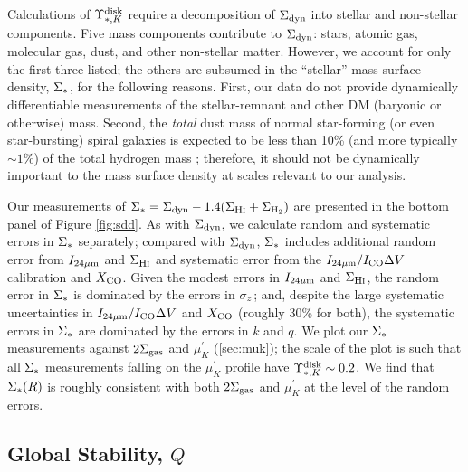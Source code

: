 \documentclass[apj,iop,numberedappendix]{emulateapj}
\begin{document}
Calculations of $\Upsilon_{\ast,K}^{\rm disk}$ require a decomposition of $\Sigma_{\rm dyn}$ into stellar
and non-stellar components.  Five mass components contribute to $\Sigma_{\rm dyn}$:
stars, atomic gas, molecular gas, dust, and other non-stellar matter.  However,
we account for only the first three listed; the others are subsumed in the
``stellar'' mass surface density, $\Sigma_{\rm \ast}$, for the following reasons.  First, our
data do not provide dynamically differentiable measurements of the
stellar-remnant and other DM (baryonic or otherwise) mass.  Second, the {\it
total} dust mass of normal star-forming (or even star-bursting) spiral galaxies
is expected to be less than 10\% (and more typically $\sim1$\%) of the total
hydrogen mass \citep{2007ApJ...663..866D}; therefore, it should not be
dynamically important to the mass surface density at scales relevant to our
analysis.  

Our measurements of $\Sigma_{\rm \ast} = \Sigma_{\rm dyn} - 1.4(\Sigma_{\mbox{\rm \footnotesize H{\scshape i}}} + \Sigma_{\rm H_2})$ are presented in the
bottom panel of Figure \ref{fig:sdd}.  As with $\Sigma_{\rm dyn}$, we calculate random
and systematic errors in $\Sigma_{\rm \ast}$ separately; compared with $\Sigma_{\rm dyn}$, $\Sigma_{\rm \ast}$
includes additional random error from $I_{24\mu{\rm m}}$ and $\Sigma_{\mbox{\rm \footnotesize H{\scshape i}}}$ and systematic error
from the $I_{24\mu{\rm m}}/I_{\rm CO}\Delta V$ calibration and $X_{\rm CO}$.  Given the modest errors in $I_{24\mu{\rm m}}$
and $\Sigma_{\mbox{\rm \footnotesize H{\scshape i}}}$, the random error in $\Sigma_{\rm \ast}$ is dominated by the errors in $\sigma_z$;
and, despite the large systematic uncertainties in $I_{24\mu{\rm m}}/I_{\rm CO}\Delta V$ and $X_{\rm CO}$
(roughly 30\% for both), the systematic errors in $\Sigma_{\rm \ast}$ are dominated by the
errors in $k$ and $q$.  We plot our $\Sigma_{\rm \ast}$ measurements against $2\Sigma_{\rm gas}$ and
$\mu^{\prime}_K$ (\sect \ref{sec:muk}); the scale of the plot is such that all
$\Sigma_{\rm \ast}$ measurements falling on the $\mu^{\prime}_K$ profile have
$\Upsilon_{\ast,K}^{\rm disk}\sim0.2$.  We find that $\Sigma_{\rm \ast}(R)$ is roughly consistent with both
$2\Sigma_{\rm gas}$ and $\mu^{\prime}_K$ at the level of the random errors.

\subsection{Global Stability, $Q$}
\label{sec:Q}
\end{document}
